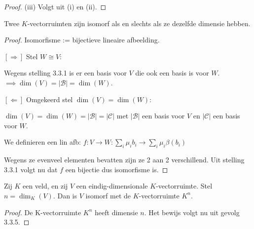\begin{proof}(iii)
    Volgt uit (i) en (ii).
\end{proof}

\begin{gevolg}[3.3.5]
    Twee $K$-vectorruimten zijn isomorf als en slechts als ze dezelfde dimensie hebben.
\end{gevolg}
\begin{proof}
    Isomorfisme := bijectieve lineaire afbeelding.

    \([\Rightarrow]\) Stel \(W \cong V\):

    Wegens stelling 3.3.1 is er een basis voor \(V\) die ook een basis is voor \(W\).
     \(\implies \dim(V) = |\mathcal{B}| = \dim(W)\).

    \([\Leftarrow]\) Omgekeerd stel \(\dim(V) = \dim(W)\):

    \(\dim(V) = \dim(W) = |\mathcal{B}|=|\mathcal{C}|\)
    met \(|\mathcal{B}|\) een basis voor \(V\) en \(|\mathcal{C}|\) een basis voor \(W\).

    We definieren een lin afb: \(f \colon V \to W: \sum_i \mu_i b_i \to \sum_i \mu_i \beta(b_i)\)

    Wegens ze evenveel elementen bevatten zijn ze 2 aan 2 verschillend.
    Uit stelling 3.3.1 volgt nu dat \(f\) een bijectie dus isomorfisme is.
\end{proof}

\begin{gevolg}[3.3.6]
    Zij $K$ een veld, en zij $V$ een eindig-dimensionale $K$-vectorruimte. Stel $n = \dim_K(V)$. Dan is $V$ isomorf met de $K$-vectorruimte $K^n$.
\end{gevolg}
\begin{proof}
    De K-vectorruimte \(K^n\) heeft dimensie \(n\). Het bewijs volgt nu uit gevolg 3.3.5.
\end{proof}

